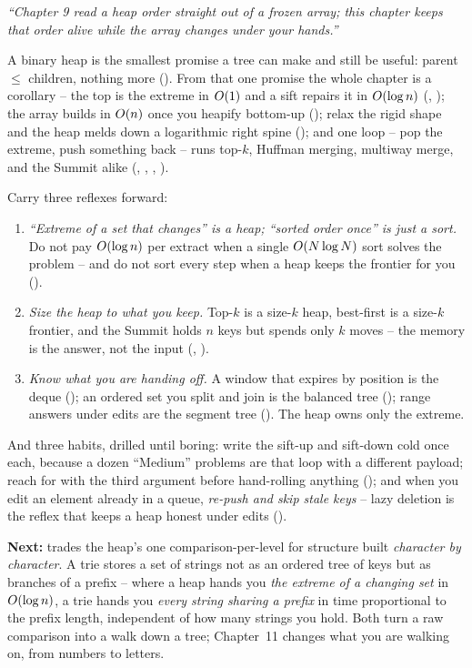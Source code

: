\begin{lastword}
\emph{``Chapter 9 read a heap order straight out of a frozen array; this chapter keeps that order alive
while the array changes under your hands.''}

\medskip
A binary heap is the smallest promise a tree can make and still be useful: parent $\le$ children, nothing
more (). From that one promise the whole chapter is a corollary -- the top is the extreme
in $O(1)$ and a sift repairs it in $O(\log n)$ (, ); the array
builds in $O(n)$ once you heapify bottom-up (); relax the rigid shape and the heap
melds down a logarithmic right spine (); and one loop -- pop the extreme, push something
back -- runs top-$k$, Huffman merging, multiway merge, and the Summit alike (,
, , ).

\medskip
Carry three reflexes forward:
\begin{enumerate}[nosep, leftmargin=1.6em]
  \item \emph{``Extreme of a set that changes'' is a heap; ``sorted order once'' is just a sort.} Do not pay
        $O(\log n)$ per extract when a single $O(N\log N)$ sort solves the problem -- and do not sort
        every step when a heap keeps the frontier for you ().
  \item \emph{Size the heap to what you keep.} Top-$k$ is a size-$k$ heap, best-first is a size-$k$ frontier,
        and the Summit holds $n$ keys but spends only $k$ moves -- the memory is the answer, not the input
        (, ).
  \item \emph{Know what you are handing off.} A window that expires by position is the deque ();
        an ordered set you split and join is the balanced tree (); range answers under edits are
        the segment tree (). The heap owns only the extreme.
\end{enumerate}

\medskip
And three habits, drilled until boring: write the sift-up and sift-down cold once each, because a dozen
``Medium'' problems are that loop with a different payload; reach for  with the
 third argument before hand-rolling anything (); and when you edit an element
already in a queue, \emph{re-push and skip stale keys} -- lazy deletion is the reflex that keeps a heap
honest under edits ().

\medskip
\textbf{Next:}  trades the heap's one comparison-per-level for structure built \emph{character by
character}. A trie stores a set of strings not as an ordered tree of keys but as branches of a prefix --
where a heap hands you \emph{the extreme of a changing set} in $O(\log n)$, a trie hands you
\emph{every string sharing a prefix} in time proportional to the prefix length, independent of how many
strings you hold. Both turn a raw comparison into a walk down a tree; Chapter~11 changes what you are
walking on, from numbers to letters.
\end{lastword}
